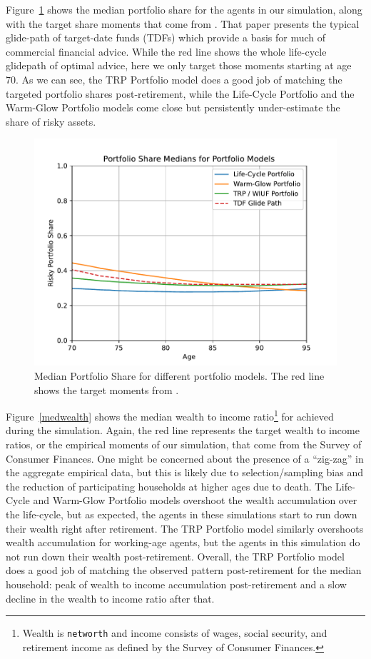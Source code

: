 \documentclass{article}
\begin{document}
Figure~\ref{medshare} shows the median portfolio share for the agents in our simulation, along with the target share moments that come from \cite{Aboagye2024}.
That paper presents the typical glide-path of target-date funds (TDFs) which provide a basis for much of commercial financial advice.
While the red line shows the whole life-cycle glidepath of optimal advice, here we only target those moments starting at age 70.
As we can see, the TRP Portfolio model does a good job of matching the targeted portfolio shares post-retirement, while the Life-Cycle Portfolio and the Warm-Glow Portfolio models come close but persistently under-estimate the share of risky assets.

\begin{figure}[!htbp]
\centering
\includegraphics[width=0.7\linewidth]{files/median_share-88a10bbb141cc4512a67a2e4e71afa58.pdf}
\caption[]{Median Portfolio Share for different portfolio models. The red line shows the target moments from \cite{Aboagye2024}.}
\label{medshare}
\end{figure}

Figure~\ref{medwealth} shows the median wealth to income ratio\footnote{Wealth is \texttt{networth} and income consists of wages, social security, and retirement income as defined by the Survey of Consumer Finances.} for achieved during the simulation.
Again, the red line represents the target wealth to income ratios, or the empirical moments of our simulation, that come from the Survey of Consumer Finances.
One might be concerned about the presence of a ``zig-zag'' in the aggregate empirical data, but this is likely due to selection/sampling bias and the reduction of participating households at higher ages due to death.
The Life-Cycle and Warm-Glow Portfolio models overshoot the wealth accumulation over the life-cycle, but as expected, the agents in these simulations start to run down their wealth right after retirement.
The TRP Portfolio model similarly overshoots wealth accumulation for working-age agents, but the agents in this simulation do not run down their wealth post-retirement.
Overall, the TRP Portfolio model does a good job of matching the observed pattern post-retirement for the median household: peak of wealth to income accumulation post-retirement and a slow decline in the wealth to income ratio after that.
\end{document}
